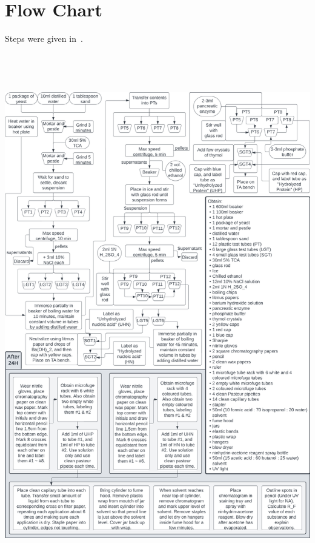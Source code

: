 \section*{Flow Chart}
Steps were given in~\citep{OLM2023}.
\begin{center}
    \includegraphics[height=9in]{flowchart.png}
\end{center}